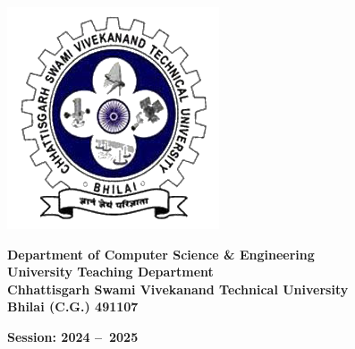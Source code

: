 \begin{titlepage}
  \noindent\makebox[\linewidth]{\rule{\textwidth}{0.4pt}}
  \begin{minipage}{0.17\textwidth}
    \centering
    \includegraphics[width=\textwidth]{images/logo.png}
  \end{minipage}
  \hfil
  \begin{minipage}{0.7\textwidth}
    \centering
    \textbf{Department of Computer Science \& Engineering}\\
    \textbf{University Teaching Department}\\
    \textbf{Chhattisgarh Swami Vivekanand Technical University}\\
    \textbf{Bhilai (C.G.) 491107}
  \end{minipage}
  \noindent\makebox[\linewidth]{\rule{\textwidth}{0.4pt}}
  \textbf{Session: 2024 --\ 2025}
  \noindent\makebox[\linewidth]{\rule{\textwidth}{0.4pt}}
  
  
\end{titlepage}
\restoregeometry %
